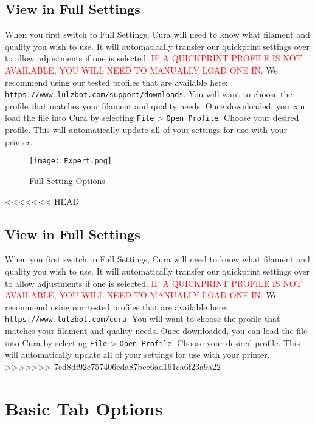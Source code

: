 \subsection{View in Full Settings}
When you first switch to Full Settings, Cura will need to know what filament and quality you wish to use. It will automatically transfer our quickprint settings over to allow adjustments if one is selected. \textcolor{red}{IF A QUICKPRINT PROFILE IS NOT AVAILABLE, YOU WILL NEED TO MANUALLY LOAD ONE IN.} We recommend using our tested profiles that are available here: \texttt{https://www.lulzbot.com/support/downloads}. You will want to choose the profile that matches your filament and quality needs. Once downloaded, you can load the file into Cura by selecting \texttt{File} > \texttt{Open Profile}. Choose your desired profile. This will automatically update all of your settings for use with your printer.
\begin{figure}[hbt]
\centering
\texttt{[image: Expert.png]}
\caption{Full Setting Options}
\label{fig:Expert Options}
\end{figure}
<<<<<<< HEAD
=======
\subsection{View in Full Settings}
When you first switch to Full Settings, Cura will need to know what filament and quality you wish to use. It will automatically transfer our quickprint settings over to allow adjustments if one is selected. \textcolor{red}{IF A QUICKPRINT PROFILE IS NOT AVAILABLE, YOU WILL NEED TO MANUALLY LOAD ONE IN.} We recommend using our tested profiles that are available here: \texttt{https://www.lulzbot.com/cura}. You will want to choose the profile that matches your filament and quality needs. Once downloaded, you can load the file into Cura by selecting \texttt{File} > \texttt{Open Profile}. Choose your desired profile. This will automatically update all of your settings for use with your printer.
>>>>>>> 7ed8df92e757406eda87bee6ad161ca6f23a9a22

\section{Basic Tab Options}

